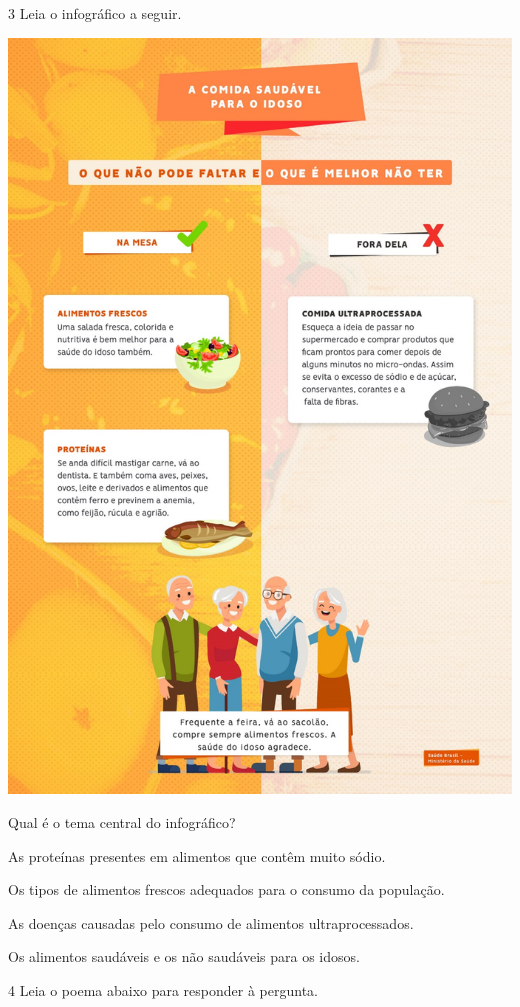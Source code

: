 \num{3} Leia o infográfico a seguir.

\begin{center}
\includegraphics[width=.6\textwidth]{media/image38.jpeg}
\end{center}



Qual é o tema central do infográfico?

\begin{escolha}
\item As proteínas presentes em alimentos que contêm muito sódio.

\item Os tipos de alimentos frescos adequados para o consumo da população.

\item As doenças causadas pelo consumo de alimentos ultraprocessados.

\item Os alimentos saudáveis e os não saudáveis para os idosos.
\end{escolha}

\num{4} Leia o poema abaixo para responder à pergunta.

